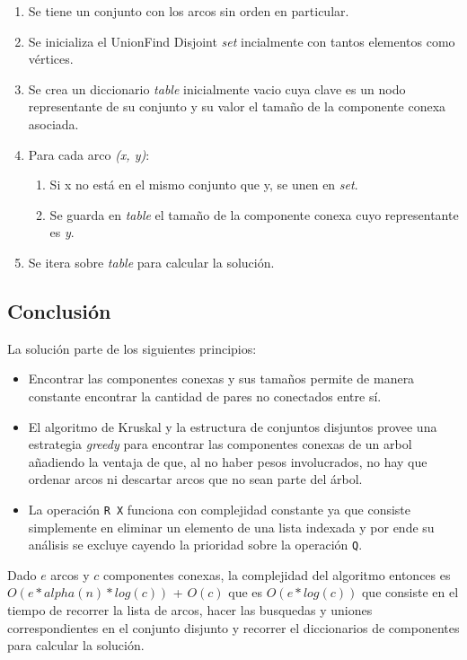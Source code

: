 \documentclass[a4paper,14pt,spanish]{article}
\begin{document}
\begin{enumerate}
    \item Se tiene un conjunto con los arcos sin orden en particular.
    \item Se inicializa el UnionFind Disjoint \emph{set} incialmente con tantos elementos como vértices.
    \item Se crea un diccionario \emph{table} inicialmente vacio cuya clave es un nodo representante de su conjunto y su valor el tamaño de la componente conexa asociada.
    \item Para cada arco \emph{(x, y)}:
    \begin{enumerate}
        \item Si x no está en el mismo conjunto que y, se unen en \emph{set}.
        \item Se guarda en \emph{table} el tamaño de la componente conexa cuyo representante es \emph{y}.
    \end{enumerate}
    \item Se itera sobre \emph{table} para calcular la solución.
\end{enumerate}

\subsection{Conclusión}
La solución parte de los siguientes principios:
\begin{itemize}
    \item Encontrar las componentes conexas y sus tamaños permite de manera constante encontrar la cantidad de pares no conectados entre sí.
    \item El algoritmo de Kruskal y la estructura de conjuntos disjuntos provee una estrategia \emph{greedy} para encontrar las componentes conexas de un arbol añadiendo la ventaja de que, al no haber pesos involucrados, no hay que ordenar arcos ni descartar arcos que no sean parte del árbol.
    \item La operación \texttt{R X} funciona con complejidad constante ya que consiste simplemente en eliminar un elemento de una lista indexada y por ende su análisis se excluye cayendo la prioridad sobre la operación \texttt{Q}.
\end{itemize}

Dado $\displaystyle e$ arcos y $\displaystyle c$ componentes conexas, la complejidad del algoritmo entonces es  $O(e*alpha(n)*log(c))$ + $O(c)$ que es $O(e*log(c))$ que consiste en el tiempo de recorrer la lista de arcos, hacer las busquedas y uniones correspondientes en el conjunto disjunto y recorrer el diccionarios de componentes para calcular la solución.
\end{document}
